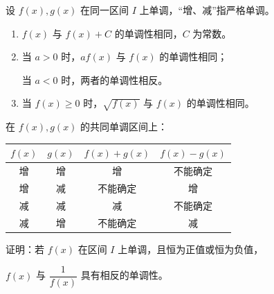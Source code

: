 
\begin{frame}[label=Doperations]
  设 $f(x),g(x)$ 在同一区间 $I$ 上单调，“增、减”指严格单调。
  \par\vspace{0.2cm}
  \begin{enumerate}
    \item $f(x)$ 与 $f(x)+C$ 的单调性相同，$C$ 为常数。
    \item 当 $a>0$ 时，$af(x)$ 与 $f(x)$ 的单调性相同；\par
          当 $a<0$ 时，两者的单调性相反。
    \item 当 $f(x)\ge0$ 时，$\sqrt{f(x)}$ 与 $f(x)$ 的单调性相同。
  \end{enumerate}
  \pause
  \Analysis{加常数不改变函数值的差；数乘取决于系数符号；\par
  平方根函数在 $[0,+\infty)$ 上严格递增。$a=0$ 时得到常函数，另行处理。}
\end{frame}

\begin{frame}[label=Dsum]
  在 $f(x),g(x)$ 的共同单调区间上：
  \begin{center}
  \renewcommand{\arraystretch}{1.5}
  \begin{tabular}{c|c|c|c}
    $f(x)$ & $g(x)$ & $f(x)+g(x)$ & $f(x)-g(x)$\\\hline
    增 & 增 & 增 & 不能确定\\
    增 & 减 & 不能确定 & 增\\
    减 & 减 & 减 & 不能确定\\
    减 & 增 & 不能确定 & 减
  \end{tabular}
  \end{center}
  \pause
\end{frame}

\begin{frame}[label=D05q]
  证明：若 $f(x)$ 在区间 $I$ 上单调，且恒为正值或恒为负值，\par
  $f(x)$ 与 $\dfrac1{f(x)}$ 具有相反的单调性。
  \pause
\end{frame}


